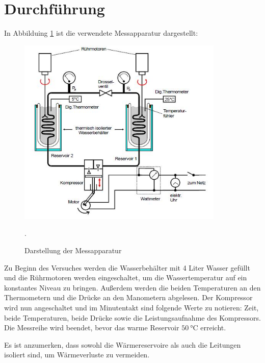 \section{Durchführung}
In Abbilduing \ref{fig:pumpe2} ist die verwendete Messapparatur dargestellt:
\begin{figure}[H]
  \centering
  \includegraphics[height=9cm]{pumpe2.JPG}
  \caption{Darstellung der Messapparatur}
  \cite{skript}.
  \label{fig:pumpe2}
\end{figure}

Zu Beginn des Versuches werden die Wasserbehälter mit 4 Liter Wasser gefüllt und
die Rührmotoren werden eingeschaltet, um die Wassertemperatur auf ein konstantes
Niveau zu bringen. Außerdem werden die beiden Temperaturen an den Thermometern und die Drücke an den Manometern abgelesen.
Der Kompressor wird nun angeschaltet und im Minutentakt sind folgende Werte zu notieren:
Zeit, beide Temperaturen, beide Drücke sowie die Leistungsaufnahme des Kompressors.
Die Messreihe wird beendet, bevor das warme Reservoir $\SI{50}{\celsius}$ erreicht.

Es ist anzumerken, dass sowohl die Wärmereservoire als auch die Leitungen isoliert sind,
um Wärmeverluste zu vermeiden.


\label{sec:Durchführung}

